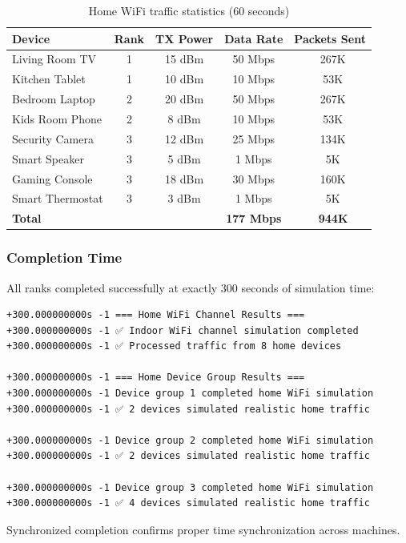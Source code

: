 \begin{table}[htbp]
\centering
\caption{Home WiFi traffic statistics (60 seconds)}
\label{tab:home-wifi-traffic}
\small
\begin{tabular}{@{}lcccc@{}}
\toprule
\textbf{Device} & \textbf{Rank} & \textbf{TX Power} & \textbf{Data Rate} & \textbf{Packets Sent} \\
\midrule
Living Room TV & 1 & 15 dBm & 50 Mbps & ~267K \\
Kitchen Tablet & 1 & 10 dBm & 10 Mbps & ~53K \\
Bedroom Laptop & 2 & 20 dBm & 50 Mbps & ~267K \\
Kids Room Phone & 2 & 8 dBm & 10 Mbps & ~53K \\
Security Camera & 3 & 12 dBm & 25 Mbps & ~134K \\
Smart Speaker & 3 & 5 dBm & 1 Mbps & ~5K \\
Gaming Console & 3 & 18 dBm & 30 Mbps & ~160K \\
Smart Thermostat & 3 & 3 dBm & 1 Mbps & ~5K \\
\midrule
\textbf{Total} & & & \textbf{177 Mbps} & \textbf{~944K} \\
\bottomrule
\end{tabular}
\end{table}

\subsubsection{Completion Time}

All ranks completed successfully at exactly 300 seconds of simulation time:

\begin{verbatim}
+300.000000000s -1 === Home WiFi Channel Results ===
+300.000000000s -1 ✅ Indoor WiFi channel simulation completed
+300.000000000s -1 ✅ Processed traffic from 8 home devices

+300.000000000s -1 === Home Device Group Results ===
+300.000000000s -1 Device group 1 completed home WiFi simulation
+300.000000000s -1 ✅ 2 devices simulated realistic home traffic

+300.000000000s -1 Device group 2 completed home WiFi simulation
+300.000000000s -1 ✅ 2 devices simulated realistic home traffic

+300.000000000s -1 Device group 3 completed home WiFi simulation
+300.000000000s -1 ✅ 4 devices simulated realistic home traffic
\end{verbatim}

Synchronized completion confirms proper time synchronization across machines.

